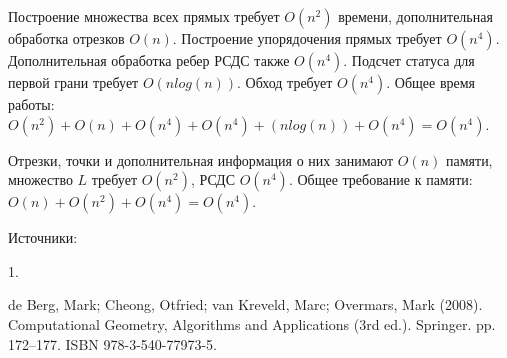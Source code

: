 \documentclass[letterpaper,12pt]{article}
\begin{document}
Построение множества всех прямых требует $O(n^2)$ времени,
дополнительная обработка отрезков $O(n)$. Построение упорядочения прямых 
требует $O(n^4)$. Дополнительная обработка ребер РСДС также $O(n^4)$.
Подсчет статуса для первой грани требует $O(n log(n))$. Обход требует $O(n^4)$.
Общее время работы:
$O(n^2) + O(n) + O(n^4) + O(n^4) + (n log(n)) + O(n^4) = O(n^4)$.

Отрезки, точки и дополнительная информация о них занимают $O(n)$ памяти,
множество $L$ требует $O(n^2)$, РСДС $O(n^4)$.
Общее требование к памяти:
$O(n) + O(n^2) + O(n^4) = O(n^4)$.

Источники:

\hypertarget{literature_1}{1.} de Berg, Mark; Cheong, Otfried; van Kreveld, Marc; Overmars, Mark (2008). 
Computational Geometry, Algorithms and Applications (3rd ed.). 
Springer. pp. 172–177. ISBN 978-3-540-77973-5.
\end{document}
